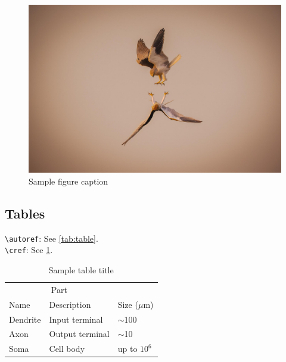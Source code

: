 \documentclass[onecolumn]{article}
\theoremstyle{definition}
\theoremstyle{remark}
\begin{document}
\lipsum[6]

\begin{figure}
    \centering
    \includegraphics[width=.9\linewidth]{fig/example1.jpg}
    \caption{Sample figure caption}
\end{figure}

\lipsum[7-8]

\subsection{Tables}

\verb+\autoref+: See \autoref{tab:table}. \\
\verb+\cref+:  See \cref{tab:table}. 

\begin{table}[h]
    \caption{Sample table title}
    \centering
    \begin{tabular}{lll}
        \toprule
        \multicolumn{2}{c}{Part}                   \\
        \cmidrule(r){1-2}
        Name     & Description     & Size ($\mu$m) \\
        \midrule
        Dendrite & Input terminal  & $\sim$100     \\
        Axon     & Output terminal & $\sim$10      \\
        Soma     & Cell body       & up to $10^6$  \\
        \bottomrule
    \end{tabular}
    \label{tab:table}
\end{table}
\end{document}

